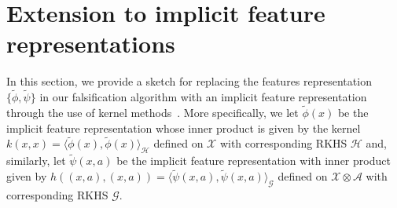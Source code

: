 \documentclass{article}
\begin{document}
\section{Extension to implicit feature representations} 
\label{app:kernel_alg}
In this section, we provide a sketch for replacing the features representation $\{\widetilde\phi, \widetilde\psi\}$ in our falsification algorithm with an implicit feature representation through the use of kernel methods~\citep{scholkopf2002learning}. More specifically, we let $\widetilde{\phi}(x)$ be the implicit feature representation whose inner product is given by the kernel $k(x,x)=\langle\widetilde{\phi}(x), \widetilde{\phi}(x)\rangle_{\mathcal{H}}$ defined on $\mathcal{X}$ with corresponding RKHS $\mathcal{H}$ and, similarly, let $\widetilde{\psi}(x,a)$ be the implicit feature representation with inner product given by $h\left((x,a),(x,a)\right)=\langle\widetilde{\psi}(x,a), \widetilde{\psi}(x,a)\rangle_{\mathcal{G}}$ defined on  $\mathcal{X} \otimes\mathcal{A}$ with corresponding RKHS $\mathcal{G}$. 
\end{document}
